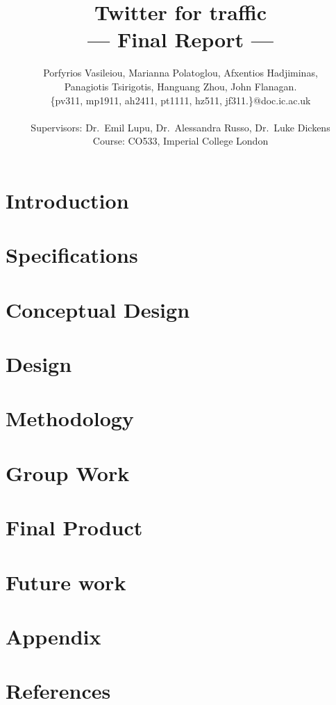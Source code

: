 \documentclass[a4paper,11pt]{article}
\title{Twitter for traffic\\\Large{--- Final Report ---}}
\author{Porfyrios Vasileiou, Marianna Polatoglou, Afxentios Hadjiminas,\\
        Panagiotis Tsirigotis, Hanguang Zhou, John Flanagan.\\
       \{pv311, mp1911, ah2411, pt1111, hz511, jf311.\}@doc.ic.ac.uk\\ \\
       \small{Supervisors: Dr.\ Emil Lupu, Dr.\ Alessandra Russo, Dr.\ Luke Dickens}\\
       \small{Course: CO533, Imperial College London}
}
\begin{document}
\maketitle
\pagebreak
\tableofcontents
\pagebreak
\section{Introduction}
	

\section{Specifications}
	

\section{Conceptual Design}
	

\section{Design}
	

\section{Methodology}
	

\section{Group Work}
	
	
\section{Final Product}
	


\section{Future work}
    
\pagebreak

\section{Appendix}
	

\pagebreak	
\section{References}
	\vspace{-20pt}
	\def\refname{}
	
	
\end{document}

